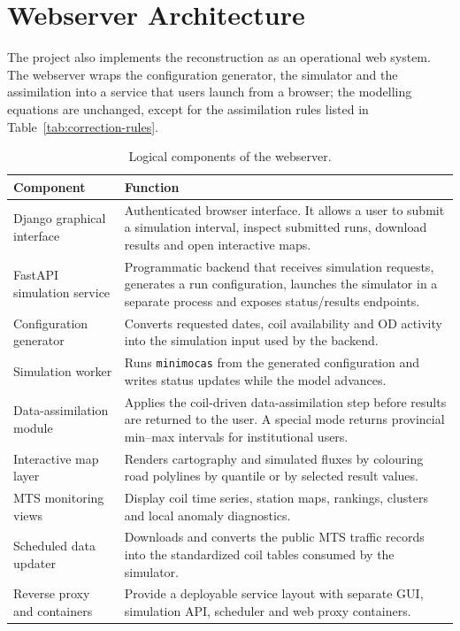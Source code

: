 \documentclass[11pt,a4paper]{article}
\newcommand{\modelname}{\texttt{minimocas}}
\begin{document}
\section{Webserver Architecture}
\label{sec:webserver}

The project also implements the reconstruction as an operational web system. The webserver wraps the configuration generator, the simulator and the assimilation into a service that users launch from a browser; the modelling equations are unchanged, except for the assimilation rules listed in Table~\ref{tab:correction-rules}.

\begin{table}[htbp]
\centering
\caption{Logical components of the webserver.}
\label{tab:web-components}
\begin{tabularx}{\linewidth}{@{}lX@{}}
\toprule
Component & Function \\
\midrule
Django graphical interface & Authenticated browser interface. It allows a
user to submit a simulation interval, inspect submitted runs, download
results and open interactive maps. \\
FastAPI simulation service & Programmatic backend that receives simulation
requests, generates a run configuration, launches the simulator in a
separate process and exposes status/results endpoints. \\
Configuration generator & Converts requested dates, coil availability and OD
activity into the simulation input used by the backend. \\
Simulation worker & Runs \modelname{} from the generated configuration and
writes status updates while the model advances. \\
Data-assimilation module & Applies the coil-driven data-assimilation step before results
are returned to the user. A special mode returns provincial min--max
intervals for institutional users. \\
Interactive map layer & Renders cartography and simulated fluxes by colouring
road polylines by quantile or by selected result values. \\
MTS monitoring views & Display coil time series, station maps, rankings,
clusters and local anomaly diagnostics. \\
Scheduled data updater & Downloads and converts the public MTS traffic
records into the standardized coil tables consumed by the simulator. \\
Reverse proxy and containers & Provide a deployable service layout with
separate GUI, simulation API, scheduler and web proxy containers. \\
\bottomrule
\end{tabularx}
\end{table}
\end{document}
